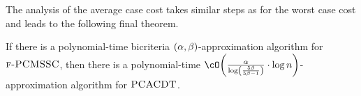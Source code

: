 The analysis of the average case cost takes similar steps as for the worst case cost and leads to the following final theorem.
\begin{theorem}\label{ea:thm:PCMSSC-to-PCACDT}
    If there is a polynomial-time bicriteria $\mathopen{}\left( \alpha, \beta \right)$-approximation algorithm for $\textup{\textsc{f-PCMSSC}}$, then there is a polynomial-time $\cO\br{\frac{\alpha}{\log\br{\frac{5\beta}{5\beta -1}}}\cdot \log n}$-approximation algorithm for $\textup{\textsc{PCACDT}}$.
\end{theorem}

